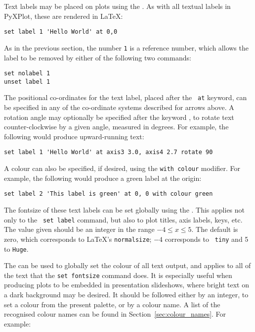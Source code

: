 Text labels may be placed on plots using the . As with all
textual labels in PyXPlot, these are rendered in \LaTeX:

\begin{verbatim}
set label 1 'Hello World' at 0,0
\end{verbatim}

As in the previous section, the number {\tt 1} is a reference number, which
allows the label to be removed by either of the following two commands:

\begin{verbatim}
set nolabel 1
unset label 1
\end{verbatim}

\noindent The positional co-ordinates for the text label, placed after the {\tt
at} keyword, can be specified in any of the co-ordinate systems described for
arrows above. A rotation angle may optionally be specified after the keyword
, to rotate text counter-clockwise by a given angle, measured
in degrees. For example, the following would produce upward-running text:

\begin{verbatim}
set label 1 'Hello World' at axis3 3.0, axis4 2.7 rotate 90
\end{verbatim}

A colour can also be specified, if desired, using the {\tt with colour}
modifier.  For example, the following would produce a green label at the origin:

\begin{verbatim}
set label 2 'This label is green' at 0, 0 with colour green
\end{verbatim}

 The fontsize of these text labels can be set
globally using the . This applies not only to the {\tt
set label} command, but also to plot titles, axis labels, keys, etc. The value
given should be an integer in the range $-4 \leq x \leq 5$. The default is
zero, which corresponds to \LaTeX's {\tt normalsize}; $-4$ corresponds to {\tt
tiny} and 5 to {\tt Huge}.

 The  can be
used to globally set the colour of all text output, and applies to all of the
text that the {\tt set fontsize} command does. It is especially useful when
producing plots to be embedded in presentation slideshows, where bright text on
a dark background may be desired. It should be followed either by an integer,
to set a colour from the present palette, or by a colour name. A list of the
recognised colour names can be found in Section~\ref{sec:colour_names}.  For
example:


